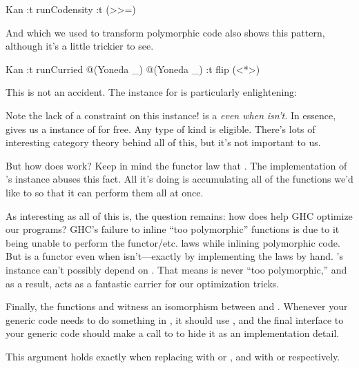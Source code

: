 \documentclass[book.tex]{subfiles}
\begin{document}
\begin{dorepl}{Kan}
:t runCodensity
:t (>>=)
\end{dorepl}

And  which we used to transform polymorphic  code
also shows this pattern, although it's a little trickier to see.

\begin{dorepl}{Kan}
:t runCurried @(Yoneda _) @(Yoneda _)
:t flip (<*>)
\end{dorepl}

This is not an accident. The  instance for 
is particularly enlightening:


Note the lack of a  constraint on this instance!  is
a  \emph{even when}  \emph{isn't.} In essence, 
gives us a instance of  for free. Any type of kind  is eligible. There's lots of interesting category theory behind all of
this, but it's not important to us.

But how does  work? Keep in mind the functor law that . The implementation of 's 
instance abuses this fact. All it's doing is accumulating all of the functions
we'd like to  so that it can perform them all at once.

As interesting as all of this is, the question remains: how does 
help GHC optimize our programs? GHC's failure to inline ``too polymorphic''
functions is due to it being unable to perform the functor/etc. laws while
inlining polymorphic code. But  is a functor even when 
isn't---exactly by implementing the  laws by hand. 's
 instance can't possibly depend on . That means 
is never ``too polymorphic,'' and as a result, acts as a fantastic carrier for
our optimization tricks.

Finally, the functions  and
 witness an \gls{isomorphism} between  and . Whenever your generic code needs to do something in ,
it should use , and the final interface to your generic code
should make a call to  to hide it as an implementation detail.

This argument holds exactly when replacing  with  or
, and  with  or  respectively.
\end{document}
